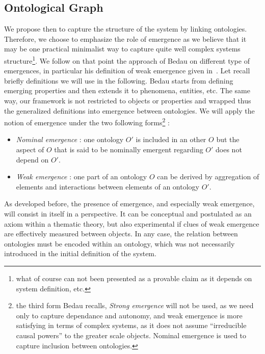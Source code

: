 \subsection*{Ontological Graph}


We propose then to capture the structure of the system by linking ontologies. %
Therefore, we choose to emphasize the role of emergence as we believe that it may be one practical minimalist way to capture quite well complex systems structure\footnote{what of course can not been presented as a provable claim as it depends on system definition, etc.}. We follow on that point the approach of Bedau on different type of emergences, in particular his definition of weak emergence given in~\cite{bedau2002downward}. Let recall briefly definitions we will use in the following. Bedau starts from defining emerging properties and then extends it to phenomena, entities, etc. The same way, our framework is not restricted to objects or properties and wrapped thus the generalized definitions into emergence between ontologies. We will apply the notion of emergence under the two following forms\footnote{the third form Bedau recalls, \emph{Strong emergence} will not be used, as we need only to capture dependance and autonomy, and weak emergence is more satisfying in terms of complex systems, as it does not assume ``irreducible causal powers'' to the greater scale objects. Nominal emergence is used to capture inclusion between ontologies.} :
\begin{itemize}
\item \emph{Nominal emergence} : one ontology $O'$ is included in an other $O$ but the aspect of $O$ that is said to be nominally emergent regarding $O'$ does not depend on $O'$.
\item \emph{Weak emergence} : one part of an ontology $O$ can be derived by aggregation of elements and interactions between elements of an ontology $O'$.
\end{itemize}

As developed before, the presence of emergence, and especially weak emergence, will consist in itself in a perspective. It can be conceptual and postulated as an axiom within a thematic theory, but also experimental if clues of weak emergence are effectively measured between objects. In any case, the relation between ontologies must be encoded within an ontology, which was not necessarily introduced in the initial definition of the system.


